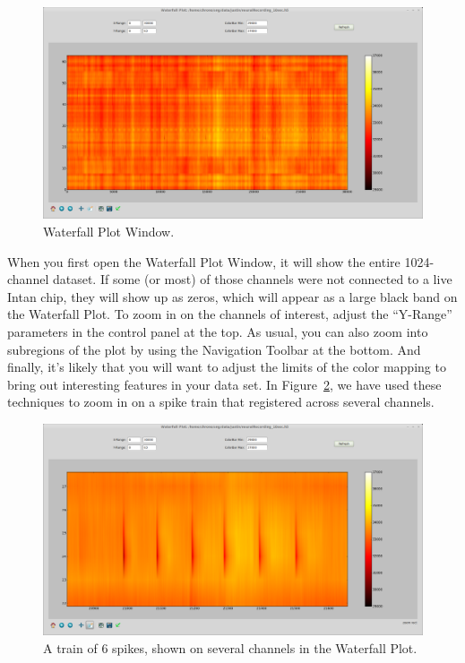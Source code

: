 \begin{figure}[h!]
\begin{center}
\includegraphics[width=17cm]{screenshots/waterfall.png}
\end{center}
\caption{Waterfall Plot Window.}
\label{fig_waterfall}
\end{figure}

When you first open the Waterfall Plot Window, it will show the entire 1024-channel dataset. If some (or most) of those channels were not connected to a live Intan chip, they will show up as zeros, which will appear as a large black band on the Waterfall Plot. To zoom in on the channels of interest, adjust the ``Y-Range'' parameters in the control panel at the top. As usual, you can also zoom into subregions of the plot by using the Navigation Toolbar at the bottom. And finally, it's likely that you will want to adjust the limits of the color mapping to bring out interesting features in your data set. In Figure~\ref{fig_waterfall_zoom}, we have used these techniques to zoom in on a spike train that registered across several channels.

\begin{figure}[h!]
\begin{center}
\includegraphics[width=17cm]{screenshots/waterfall_zoom.png}
\end{center}
\caption{A train of 6 spikes, shown on several channels in the Waterfall Plot.}
\label{fig_waterfall_zoom}
\end{figure}









